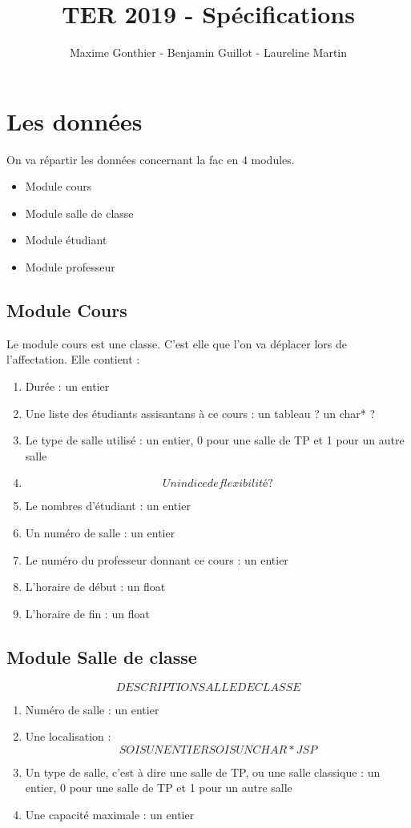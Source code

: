 \documentclass[a4paper,11pt]{article}
\title{TER 2019 - Spécifications}
\author{Maxime Gonthier - Benjamin Guillot - Laureline Martin}
\begin{document}
	\clearpage
	\maketitle

\newpage
\tableofcontents

\newpage
\section{Les données}
	On va répartir les données concernant la fac en 4 modules.\\
	\begin{itemize}
		\item Module cours
		\item Module salle de classe
		\item Module étudiant
		\item Module professeur
	\end{itemize}
	\subsection{Module Cours}
		Le module cours est une classe. C'est elle que l'on va déplacer lors de l'affectation. Elle contient : 
		\begin{enumerate}
			\item Durée : un entier
			\item Une liste des étudiants assisantans à ce cours : un tableau ? un char* ?
			\item Le type de salle utilisé : un entier, 0 pour une salle de TP et 1 pour un autre salle
			\item $$Un indice de flexibilité ?$$
			\item Le nombres d'étudiant : un entier
			\item Un numéro de salle : un entier
			\item Le numéro du professeur donnant ce cours : un entier
			\item L'horaire de début : un float
			\item L'horaire de fin : un float
		\end{enumerate}
	\subsection{Module Salle de classe}
		$$DESCRIPTION SALLE DE CLASSE$$
		\begin{enumerate}
			\item Numéro de salle : un entier
			\item Une localisation : $$SOIS UN ENTIER SOIS UN CHAR* JSP$$
			\item Un type de salle, c'est à dire une salle de TP, ou une salle classique : un entier, 0 pour une salle de TP et 1 pour un autre salle
			\item Une capacité maximale : un entier
		\end{enumerate}
\end{document}
